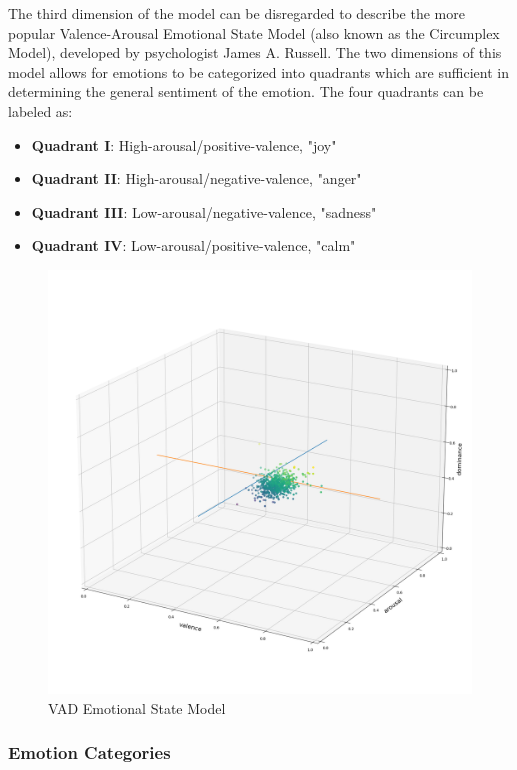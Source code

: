 \documentclass[11pt]{article}
\begin{document}
The third dimension of the model can be disregarded to describe the more popular Valence-Arousal Emotional State Model (also known as the Circumplex Model), developed by psychologist James A. Russell. The two dimensions of this model allows for emotions to be categorized into quadrants which are sufficient in determining the general sentiment of the emotion. The four quadrants can be labeled as:
\begin{itemize}
  \item \textbf{Quadrant I}: High-arousal/positive-valence, "joy"
  \item \textbf{Quadrant II}: High-arousal/negative-valence, "anger"
  \item \textbf{Quadrant III}: Low-arousal/negative-valence, "sadness"
  \item \textbf{Quadrant IV}: Low-arousal/positive-valence, "calm"
\end{itemize}

\begin{figure}[!ht]
  \includegraphics[scale=0.45]{../statics/vad.png}
  \centering
  \caption{VAD Emotional State Model}
  \label{fig:va}
\end{figure}

\subsubsection{Emotion Categories}
\end{document}
